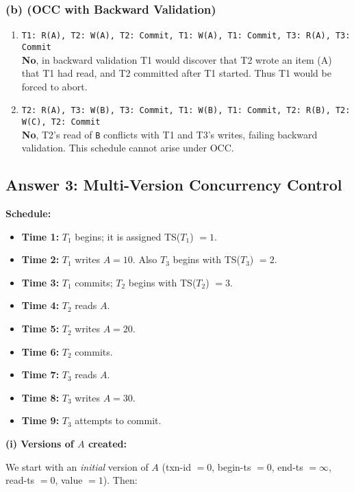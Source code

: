 \documentclass[11pt]{article}
\begin{document}
\subsubsection*{(b) \; (OCC with Backward Validation)}
\begin{enumerate}
  \item \texttt{T1: R(A), T2: W(A), T2: Commit, T1: W(A), T1: Commit, T3: R(A), T3: Commit} \\
  \textbf{No}, in backward validation T1 would discover that T2 wrote an item (A) that T1 had read, and T2 committed after T1 started. Thus T1 would be forced to abort.

  \item \texttt{T2: R(A), T3: W(B), T3: Commit, T1: W(B), T1: Commit, T2: R(B), T2: W(C), T2: Commit} \\
  \textbf{No}, T2's read of \texttt{B} conflicts with T1 and T3's writes, failing backward validation. This schedule cannot arise under OCC.
\end{enumerate}

\subsection*{Answer 3: Multi-Version Concurrency Control}

\noindent
\textbf{Schedule:}

\begin{itemize}
  \item \textbf{Time 1:} $T_1$ begins; it is assigned TS($T_1$) $= 1.$
  \item \textbf{Time 2:} $T_1$ writes $A = 10$. Also $T_3$ begins with TS($T_3$) $= 2.$
  \item \textbf{Time 3:} $T_1$ commits; $T_2$ begins with TS($T_2$) $= 3.$
  \item \textbf{Time 4:} $T_2$ reads $A.$
  \item \textbf{Time 5:} $T_2$ writes $A = 20.$
  \item \textbf{Time 6:} $T_2$ commits.
  \item \textbf{Time 7:} $T_3$ reads $A.$
  \item \textbf{Time 8:} $T_3$ writes $A = 30.$
  \item \textbf{Time 9:} $T_3$ attempts to commit.
\end{itemize}

\noindent
\textbf{(i) Versions of $A$ created:}

We start with an \emph{initial} version of $A$ (txn-id $=0$, begin-ts $=0$, end-ts $=\infty$, read-ts $=0$, value $=1$). Then:
\end{document}

